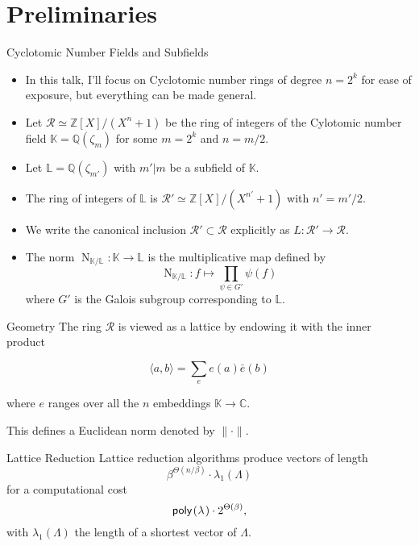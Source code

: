 \documentclass[presentation,smaller]{beamer}
\newcommand{\cR}{\ensuremath{\mathcal{R}}\xspace}
\newcommand{\Z}{\ensuremath{\mathbb Z}\xspace}
\newcommand{\K}{\ensuremath{\mathbb K}\xspace}
\renewcommand{\L}{\ensuremath{\mathbb L}\xspace}
\newcommand{\Q}{\ensuremath{\mathbb Q}\xspace}
\DeclareMathOperator{\Norm}{N}
\begin{document}
\section{Preliminaries}
\label{sec:org24e40ed}

\begin{frame}[label={sec:orgc49a5a7}]{Cyclotomic Number Fields and Subfields}
\begin{itemize}
\item In this talk, I’ll focus on Cyclotomic number rings of degree \(n = 2^k\) for ease of exposure, but everything can be made general.

\item Let \(\cR ≃ \Z[X]/(X^{n}+1)\) be the ring of integers of the Cylotomic number field \(\K = \Q(ζ_m)\) for some \(m=2^k\) and \(n = m/2\).

\item Let \(\L = \Q(ζ_{m'})\) with \(m' | m\) be a subfield of \(\K\).

\item The ring of integers of \(\L\) is \(\cR' ≃ \Z[X]/(X^{n'} + 1)\) with \(n' = m'/2\).

\item We write the canonical inclusion \(\cR' \subset \cR\) explicitly as \(L : \cR' \rightarrow \cR\).

\item The norm \(\Norm_{\K/\L}: \K \rightarrow \L\) is the multiplicative map defined by \[\Norm_{\K/\L} : f \mapsto  \prod_{\psi \in G'} \psi(f)\] where \(G'\) is the Galois subgroup corresponding to \(\L\).
\end{itemize}
\end{frame}

\begin{frame}[label={sec:org0e2c049}]{Geometry}
The ring \(\cR\) is viewed as a lattice by endowing it with the inner product

\begin{equation}
\langle a , b\rangle = \sum_e e(a) \bar e(b)
\end{equation}

where \(e\) ranges over all the \(n\) embeddings \(\mathbb K \rightarrow \mathbb C\).

This defines a Euclidean norm denoted by \(\| \cdot \|\).
\end{frame}

\begin{frame}[label={sec:org8365f41}]{Lattice Reduction}
Lattice reduction algorithms produce vectors of length \[β^{Θ(n/β)} ⋅ λ_1(Λ)\] for a computational cost \[\poly \cdot 2^{\Theta(\beta)},\] with \(λ_1(Λ)\) the length of a shortest vector of \(Λ\).
\end{frame}
\end{document}
